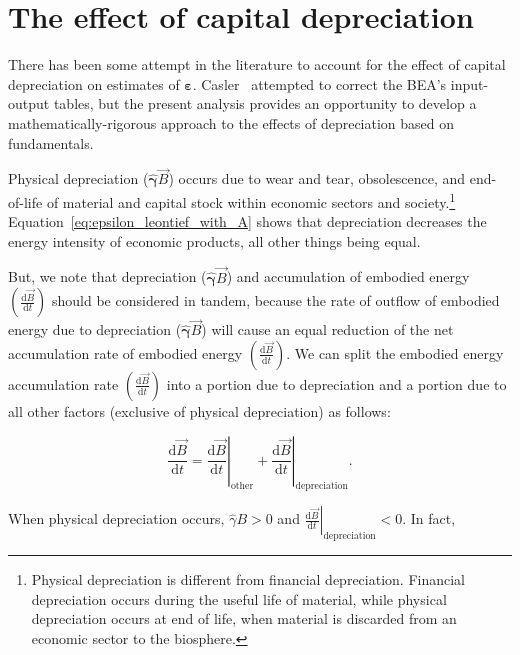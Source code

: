 \section{The effect of capital depreciation}

There has been some attempt in the literature to 
account for the effect
of capital depreciation on estimates 
of $\bm{\varepsilon}$. 
Casler~\cite{Casler:1983uy} attempted to correct the BEA's
input-output tables,
but the present analysis provides an opportunity
to develop a mathematically-rigorous approach to the 
effects of depreciation based on fundamentals.

Physical depreciation ($\hat{\bm{\gamma}}\vec{B}$)
occurs due to wear and tear, obsolescence, and end-of-life
of material and capital stock 
within economic sectors and society.\footnote{Physical depreciation
is different from financial depreciation. 
Financial depreciation occurs during the useful life of material, 
while physical depreciation occurs at end of life, 
when material is discarded from an economic sector to the biosphere.}
Equation~\ref{eq:epsilon_leontief_with_A} shows that 
depreciation decreases the energy intensity of economic products,
all other things being equal.

But, we note that depreciation ($\hat{\bm{\gamma}}\vec{B}$) 
and accumulation of embodied energy 
$\left( \frac{\mathrm{d}\vec{B}}{\mathrm{d}t} \right)$
should be considered in tandem,
because the rate of outflow of embodied energy due to depreciation
($\hat{\bm{\gamma}}\vec{B}$)
will cause an equal reduction of the net accumulation rate of embodied energy
$\left( \frac{\mathrm{d}\vec{B}}{\mathrm{d}t} \right)$.
We can split the embodied energy accumulation rate 
$\left( \frac{\mathrm{d}\vec{B}}{\mathrm{d}t} \right)$
into a portion due to depreciation and a portion due to 
all other factors (exclusive of physical depreciation) as follows:

\begin{equation} \label{eq:dB_dt_split}
	\frac{\mathrm{d}\vec{B}}{\mathrm{d}t} 
	= \left. \frac{\mathrm{d}\vec{B}}{\mathrm{d}t} \right|_{\mathrm{other}} 
	+ \left. \frac{\mathrm{d}\vec{B}}{\mathrm{d}t} \right|_{\mathrm{depreciation}}.
\end{equation}

\noindent{}When physical depreciation occurs,
$\hat{\gamma}B > 0$ and 
$\left. \frac{\mathrm{d}\vec{B}}{\mathrm{d}t} \right|_{\mathrm{depreciation}} < 0$.
In fact,

